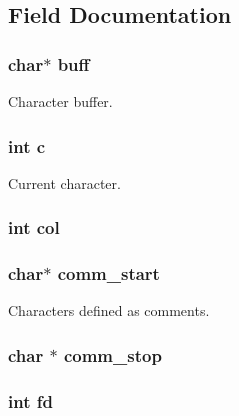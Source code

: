 \subsection{Field Documentation}
\hypertarget{structreader_a13d46a89176726a5343cab02f94ebc9e}{
\subsubsection[{buff}]{\setlength{\rightskip}{0pt plus 5cm}char$\ast$ buff}}\label{structreader_a13d46a89176726a5343cab02f94ebc9e}
Character buffer. \hypertarget{structreader_a4e1e0e72dd773439e333c84dd762a9c3}{
\subsubsection[{c}]{\setlength{\rightskip}{0pt plus 5cm}int c}}\label{structreader_a4e1e0e72dd773439e333c84dd762a9c3}
Current character. \hypertarget{structreader_afb52e720f5f0c483db5861f9e42e924e}{
\subsubsection[{col}]{\setlength{\rightskip}{0pt plus 5cm}int col}}\label{structreader_afb52e720f5f0c483db5861f9e42e924e}
\hypertarget{structreader_a3fd4f881fc99ba16113b96ddc9f2fe1b}{
\subsubsection[{comm\-\_\-start}]{\setlength{\rightskip}{0pt plus 5cm}char$\ast$ comm\-\_\-start}}\label{structreader_a3fd4f881fc99ba16113b96ddc9f2fe1b}
Characters defined as comments. \hypertarget{structreader_ab8cdabb86ef61bbce6789f770999cc75}{
\subsubsection[{comm\-\_\-stop}]{\setlength{\rightskip}{0pt plus 5cm}char $\ast$ comm\-\_\-stop}}\label{structreader_ab8cdabb86ef61bbce6789f770999cc75}
\hypertarget{structreader_a6f8059414f0228f0256115e024eeed4b}{
\subsubsection[{fd}]{\setlength{\rightskip}{0pt plus 5cm}int fd}}\label{structreader_a6f8059414f0228f0256115e024eeed4b}
